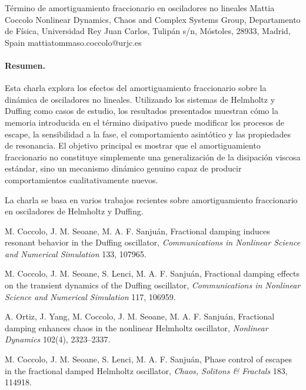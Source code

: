 \documentclass[11pt,a4paper]{article}
\begin{document}

\begin{sincabstract}
{Término de amortiguamiento fraccionario en osciladores no lineales}
{Mattia Coccolo}
{Nonlinear Dynamics, Chaos and Complex Systems Group, Departamento de Física, Universidad Rey Juan Carlos, Tulipán s/n, Móstoles, 28933, Madrid, Spain}
{mattiatommaso.coccolo@urjc.es}

\paragraph{Resumen.}
Esta charla explora los efectos del amortiguamiento fraccionario sobre la dinámica de osciladores no lineales. Utilizando los sistemas de Helmholtz y Duffing como casos de estudio, los resultados presentados muestran cómo la memoria introducida en el término disipativo puede modificar los procesos de escape, la sensibilidad a la fase, el comportamiento asintótico y las propiedades de resonancia. El objetivo principal es mostrar que el amortiguamiento fraccionario no constituye simplemente una generalización de la disipación viscosa estándar, sino un mecanismo dinámico genuino capaz de producir comportamientos cualitativamente nuevos.

La charla se basa en varios trabajos recientes sobre amortiguamiento fraccionario en osciladores de Helmholtz y Duffing.


\begin{enumerate}[label={[\arabic*]},leftmargin=*]
\item M. Coccolo, J. M. Seoane, M. A. F. Sanjuán, Fractional damping induces resonant behavior in the Duffing oscillator, \textit{Communications in Nonlinear Science and Numerical Simulation} 133, 107965.
\item M. Coccolo, J. M. Seoane, S. Lenci, M. A. F. Sanjuán, Fractional damping effects on the transient dynamics of the Duffing oscillator, \textit{Communications in Nonlinear Science and Numerical Simulation} 117, 106959.
\item A. Ortiz, J. Yang, M. Coccolo, J. M. Seoane, M. A. F. Sanjuán, Fractional damping enhances chaos in the nonlinear Helmholtz oscillator, \textit{Nonlinear Dynamics} 102(4), 2323--2337.
\item M. Coccolo, J. M. Seoane, S. Lenci, M. A. F. Sanjuán, Phase control of escapes in the fractional damped Helmholtz oscillator, \textit{Chaos, Solitons \& Fractals} 183, 114918.
\end{enumerate}
\end{sincabstract}
\end{document}
